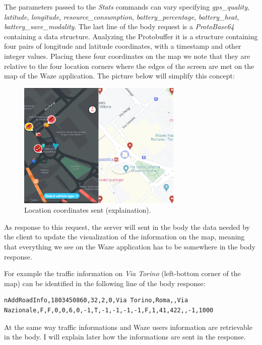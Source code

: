 			The parameters passed to the \textit{Stats} commands can vary specifying \textit{gps\_quality}, \textit{latitude}, \textit{longitude}, \textit{resource\_consumption}, \textit{battery\_percentage}, \textit{battery\_heat}, \textit{battery\_save\_modality}.
			The last line of the body request is a \textit{ProtoBase64} containing a data structure. Analyzing the Protobuffer it is a structure containing four pairs of longitude and latitude coordinates, with a timestamp and other integer values. Placing these four coordinates on the map we note that they are relative to the four location corners where the edges of the screen are met on the map of the Waze application. The picture below will simplify this concept:
			\begin{figure}[H]
				\centering
				\includegraphics[width=0.7\textwidth]{images/waze_idle4pointsapp.png}
				\caption{Location coordinates sent (explaination).}
			\end{figure}
			As response to this request, the server will sent in the body the data needed by the client to update the visualization of the information on the map, meaning that everything we see on the Waze application has to be somewhere in the body response.\newline
			\par For example the traffic information on \textit{Via Torino} (left-bottom corner of the map) can be identified in the following line of the body response:
			\begin{lstlisting}
nAddRoadInfo,1803450860,32,2,0,Via Torino,Roma,,Via Nazionale,F,F,0,0,6,0,-1,T,-1,-1,-1,-1,F,1,41,422,,-1,1000
			\end{lstlisting}
			At the same way traffic informations and Waze users information are retrievable in the body. I will explain later how the informations are sent in the response.
			

